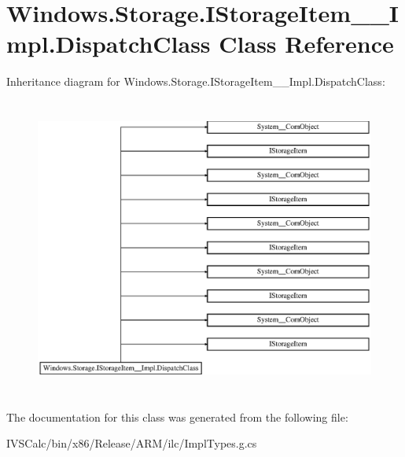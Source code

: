 \hypertarget{class_windows_1_1_storage_1_1_i_storage_item_____impl_1_1_dispatch_class}{}\section{Windows.\+Storage.\+I\+Storage\+Item\+\_\+\+\_\+\+Impl.\+Dispatch\+Class Class Reference}
\label{class_windows_1_1_storage_1_1_i_storage_item_____impl_1_1_dispatch_class}
Inheritance diagram for Windows.\+Storage.\+I\+Storage\+Item\+\_\+\+\_\+\+Impl.\+Dispatch\+Class\+:\begin{figure}[H]
\begin{center}
\leavevmode
\includegraphics[height=9.903537cm]{class_windows_1_1_storage_1_1_i_storage_item_____impl_1_1_dispatch_class}
\end{center}
\end{figure}


The documentation for this class was generated from the following file\+:\begin{DoxyCompactItemize}
\item 
I\+V\+S\+Calc/bin/x86/\+Release/\+A\+R\+M/ilc/Impl\+Types.\+g.\+cs\end{DoxyCompactItemize}
